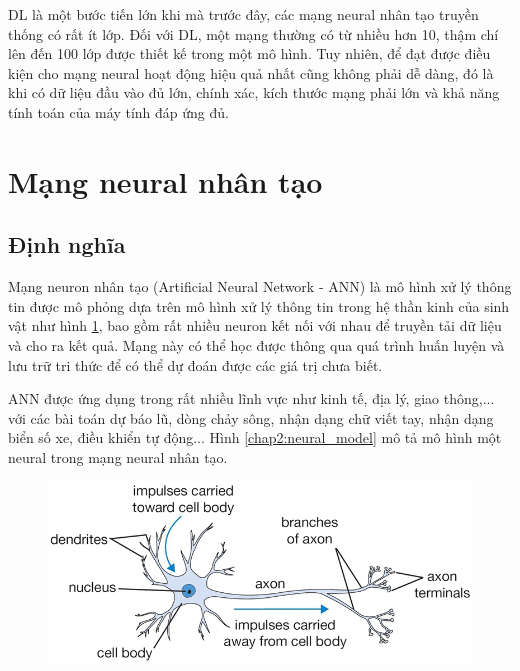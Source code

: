 DL là một bước tiến lớn khi mà trước đây, các mạng neural nhân tạo truyền thống có rất ít lớp. Đối với DL, một mạng thường có từ nhiều hơn 10, thậm chí lên đến 100 lớp được thiết kế trong một mô hình. Tuy nhiên, để đạt được điều kiện cho mạng neural hoạt động hiệu quả nhất cũng không phải dễ dàng, đó là khi có dữ liệu đầu vào đủ lớn, chính xác, kích thước mạng phải lớn và khả năng tính toán của máy tính đáp ứng đủ.

\section{Mạng neural nhân tạo}
\subsection{Định nghĩa}
Mạng neuron nhân tạo (Artificial Neural Network - ANN) là mô hình xử lý thông tin được mô phỏng dựa trên mô hình xử lý thông tin trong hệ thần kinh của sinh vật như hình \ref{chap2:animal_neural}, bao gồm rất nhiều neuron kết nối với nhau để truyền tải dữ liệu và cho ra kết quả. Mạng này có thể học được thông qua quá trình huấn luyện và lưu trữ tri thức để có thể dự đoán được các giá trị chưa biết.

ANN được ứng dụng trong rất nhiều lĩnh vực như kinh tế, địa lý, giao thông,... với các bài toán dự báo lũ, dòng chảy sông, nhận dạng chữ viết tay, nhận dạng biển số xe, điều khiển tự động...
Hình \ref{chap2:neural_model} mô tả mô hình một neural trong mạng neural nhân tạo.
\begin{center}
    \begin{figure}[H]
    \centering
    \includegraphics[width=0.6\columnwidth]{images/chap2/neuron.png}
    \label{chap2:animal_neural}
    \end{figure}
\end{center}

